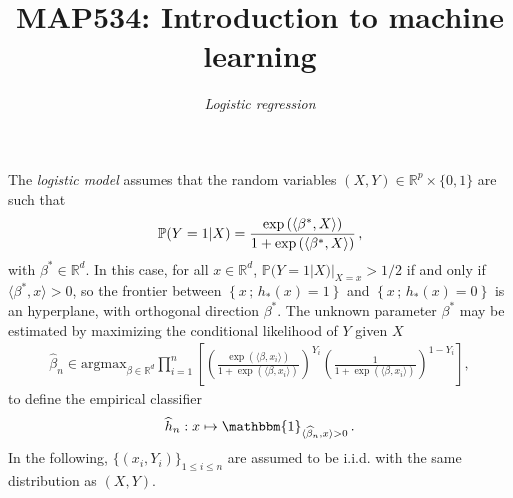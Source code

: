 \documentclass[a4paper,10pt,fleqn]{article}
\title{{\bf MAP534:  Introduction to machine learning}}
\author{{\em Logistic regression}}
\date{}
\newcommand{\eqsp}{\,}
\newcommand{\rset}{\ensuremath{\mathbb{R}}}
\newcommand{\bP}{\mathbb{P}}
\newcommand{\1}{\ensuremath{\mathbbm{1}}}
\begin{document}
\maketitle


The \emph{logistic model} assumes that the random variables  $(X,Y)\in \rset^p\times\{0,1\}$ are such that
$$
\bP(Y=1|X)={\exp\left(\langle \beta^*,X\rangle\right)\over 1+\exp\left(\langle \beta^*,X\rangle\right)}\eqsp,
$$
with $\beta^*\in\mathbb{R}^d$. In this case, for all $x\in\rset^d$, $\bP(Y=1|X)|_{X=x}>1/2$ if and only if $\langle \beta^*,x\rangle>0$, so
the frontier between $\left\{x\eqsp;\eqsp h_{*}(x)=1\right\}$ and $\left\{x\eqsp ;\eqsp h_{*}(x)=0\right\}$ is an hyperplane, with orthogonal
direction $\beta^*$. The unknown parameter $\beta^*$ may be estimated  by maximizing the conditional likelihood of $Y$ given $X$
\begin{align*}
\widehat \beta_n\in\mathrm{argmax}_{\beta\in\mathbb{R}^{d}}
\prod_{i=1}^n \left[ \left( \frac{\exp\left(\langle
	\beta,x_{i}\rangle\right)}{1+\exp\left(\langle
	\beta,x_{i}\rangle\right)}\right)^{Y_{i}}
\left(\frac{1}{1+\exp\left(\langle
	\beta,x_{i}\rangle\right)}\right)^{1- Y_{i}} \right] ,
\end{align*}
to define the empirical classifier
$$
\widehat h_{n}: x \mapsto \1_{\langle \widehat\beta_n,x\rangle>0}\eqsp.
$$
In the following, $\{(x_i,Y_i)\}_{1\leqslant i\leqslant n}$ are assumed to be i.i.d. with the same distribution as $(X,Y)$.
\end{document}
